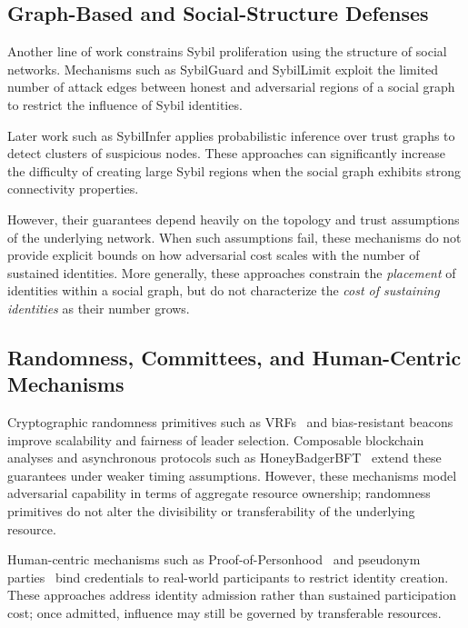 \documentclass[journal]{IEEEtran}
\begin{document}
	
	\subsection{Graph-Based and Social-Structure Defenses}
	
	Another line of work constrains Sybil proliferation
	using the structure of social networks.
	Mechanisms such as SybilGuard \cite{yu2006sybilguard}
	and SybilLimit \cite{yu2008sybillimit}
	exploit the limited number of attack edges between
	honest and adversarial regions of a social graph
	to restrict the influence of Sybil identities.
	
	Later work such as SybilInfer \cite{danezis2009sybilinfer}
	applies probabilistic inference over trust graphs to detect
	clusters of suspicious nodes.
	These approaches can significantly increase the difficulty
	of creating large Sybil regions when the social graph
	exhibits strong connectivity properties.
	
	However, their guarantees depend heavily on the topology
	and trust assumptions of the underlying network.
	When such assumptions fail,
	these mechanisms do not provide explicit bounds on
	how adversarial cost scales with the number of sustained identities.
	More generally, these approaches constrain the \emph{placement}
	of identities within a social graph, but do not characterize
	the \emph{cost of sustaining identities} as their number grows.
	\subsection{Randomness, Committees, and Human-Centric Mechanisms}
	
	Cryptographic randomness primitives such as
	VRFs~\cite{micali1999vrf} and bias-resistant
	beacons~\cite{syta2017scalable} improve scalability and
	fairness of leader selection.
	Composable blockchain analyses
	\cite{garay2015backbone,pass2017hybrid,pass2016snowwhite}
	and asynchronous protocols such as
	HoneyBadgerBFT~\cite{miller2016honeybadger}
	extend these guarantees under weaker timing assumptions.
	However, these mechanisms model adversarial capability in
	terms of aggregate resource ownership; randomness primitives
	do not alter the divisibility or transferability of the
	underlying resource.
	
	Human-centric mechanisms such as
	Proof-of-Personhood~\cite{borge2017pop} and
	pseudonym parties~\cite{ford2020pseudonym}
	bind credentials to real-world participants to restrict
	identity creation.
	These approaches address identity admission rather than
	sustained participation cost; once admitted, influence
	may still be governed by transferable resources.
	
\end{document}
